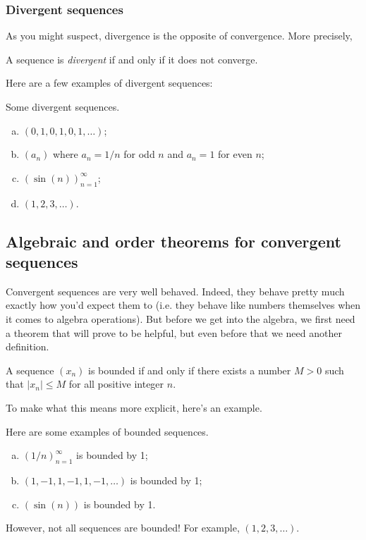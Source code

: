 \documentclass[class=article, crop=false]{standalone}
\begin{document}
\subsubsection*{Divergent sequences}
As you might suspect, divergence is the opposite of convergence. More precisely,
\begin{defn}
    A sequence is \textit{divergent} if and only if it does not converge.
\end{defn}
Here are a few examples of divergent sequences:
\begin{ex}
    Some divergent sequences.
    \begin{enumerate}[(a)]
        \item $(0,1,0,1,0,1,\ldots)$;
        \item $(a_n)$ where $a_n = 1/n$ for odd $n$ and $a_n = 1$ for even $n$;
        \item $(\sin (n))_{n=1}^\infty$;
        \item $(1,2,3,\ldots)$.
    \end{enumerate}
\end{ex}

\subsection{Algebraic and order theorems for convergent sequences}

Convergent sequences are very well behaved. Indeed, they behave pretty much exactly how you'd expect them to (i.e. they behave like numbers themselves when it comes to algebra operations). But before we get into the algebra, we first need a theorem that will prove to be helpful, but even before that we need another definition.

\begin{defn}
    A sequence $(x_n)$ is bounded if and only if there exists a number $M > 0$ such that $|x_n| \leq M$ for all positive integer $n$.
\end{defn}
To make what this means more explicit, here's an example.
\begin{ex}
    Here are some examples of bounded sequences.
        \begin{enumerate}[(a)]
            \item $(1/n)_{n=1}^\infty$ is bounded by 1;
            \item $(1,-1,1,-1,1,-1,\ldots)$ is bounded by 1;
            \item $(\sin(n))$ is bounded by 1.
        \end{enumerate}
\end{ex}
However, not all sequences are bounded! For example, $(1,2,3,\ldots)$.
\end{document}
